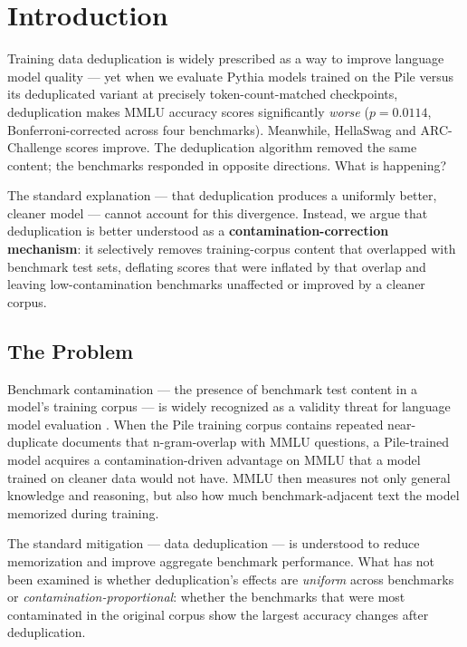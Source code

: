 \section{Introduction}

Training data deduplication is widely prescribed as a way to improve language model
quality --- yet when we evaluate Pythia models trained on the Pile versus its
deduplicated variant at precisely token-count-matched checkpoints, deduplication
makes MMLU accuracy scores significantly \textit{worse} ($p = 0.0114$, Bonferroni-corrected
across four benchmarks). Meanwhile, HellaSwag and ARC-Challenge scores
improve. The deduplication algorithm removed the same content; the benchmarks
responded in opposite directions. What is happening?

The standard explanation --- that deduplication produces a uniformly better, cleaner
model --- cannot account for this divergence. Instead, we argue that deduplication
is better understood as a \textbf{contamination-correction mechanism}: it
selectively removes training-corpus content that overlapped with benchmark test
sets, deflating scores that were inflated by that overlap and leaving
low-contamination benchmarks unaffected or improved by a cleaner corpus.

\subsection{The Problem}

Benchmark contamination --- the presence of benchmark test content in a model's
training corpus --- is widely recognized as a validity threat for language model
evaluation \citep{Brown2020Language, Lee2022Deduplicating}. When the Pile training corpus
contains repeated near-duplicate documents that n-gram-overlap with MMLU questions,
a Pile-trained model acquires a contamination-driven advantage on MMLU that a
model trained on cleaner data would not have. MMLU then measures not only
general knowledge and reasoning, but also how much benchmark-adjacent text
the model memorized during training.

The standard mitigation --- data deduplication \citep{Lee2022Deduplicating} --- is understood to
reduce memorization and improve aggregate benchmark performance. What has not been
examined is whether deduplication's effects are \textit{uniform} across benchmarks or
\textit{contamination-proportional}: whether the benchmarks that were most contaminated
in the original corpus show the largest accuracy changes after deduplication.

